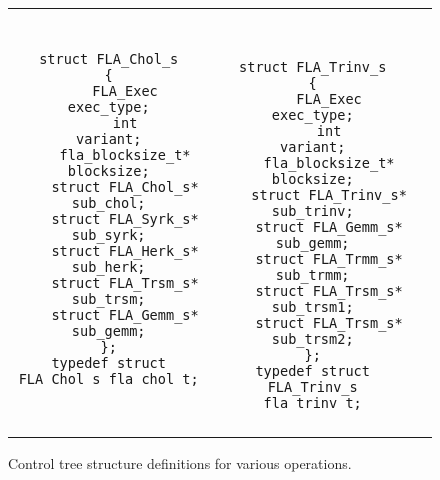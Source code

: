 \begin{figure}[t]
\begin{center}
\begin{tabular}{|c|c|c|}
\begin{minipage}[t]{1.5in}
{\tiny
\begin{verbatim}
struct FLA_Chol_s
{
    FLA_Exec           exec_type;
    int                variant;
    fla_blocksize_t*   blocksize;
    struct FLA_Chol_s* sub_chol;
    struct FLA_Syrk_s* sub_syrk;
    struct FLA_Herk_s* sub_herk;
    struct FLA_Trsm_s* sub_trsm;
    struct FLA_Gemm_s* sub_gemm;
};
typedef struct FLA_Chol_s fla_chol_t;
\end{verbatim}
}
\end{minipage}
&
\begin{minipage}[t]{1.5in}
{\tt \tiny
\begin{verbatim}
struct FLA_Trinv_s
{
    FLA_Exec            exec_type;
    int                 variant;
    fla_blocksize_t*    blocksize;
    struct FLA_Trinv_s* sub_trinv;
    struct FLA_Gemm_s*  sub_gemm;
    struct FLA_Trmm_s*  sub_trmm;
    struct FLA_Trsm_s*  sub_trsm1;
    struct FLA_Trsm_s*  sub_trsm2;
};
typedef struct FLA_Trinv_s fla_trinv_t;
\end{verbatim}
}
\end{minipage}
\\
 & & \\ \hline
\end{tabular}
\end{center}
\caption{
Control tree structure definitions for various operations.
}
\label{fig:cntl-tree-structs}
\end{figure}
